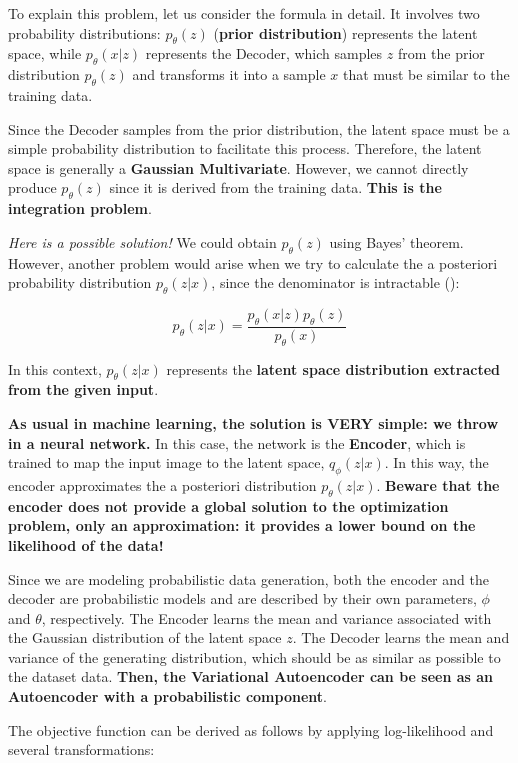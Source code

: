 To explain this problem, let us consider the formula in detail. It involves two probability distributions: $p_{\theta}(z)$ (\textbf{prior distribution}) represents the latent space, while $p_{\theta}(x|z)$ represents the Decoder, which samples $z$ from the prior distribution $p_{\theta}(z)$ and transforms it into a sample $x$ that must be similar to the training data.

Since the Decoder samples from the prior distribution, the latent space must be a simple probability distribution to facilitate this process. Therefore, the latent space is generally a \textbf{Gaussian Multivariate}. However, we cannot directly produce $p_{\theta}(z)$ since it is derived from the training data. \textbf{This is the integration problem}.

\textit{Here is a possible solution!} We could obtain $p_{\theta}(z)$ using Bayes' theorem. However, another problem would arise when we try to calculate the a posteriori probability distribution $p_{\theta}(z|x)$, since the denominator is intractable ():

$$p_{\theta}(z|x)= \frac{p_{\theta}(x|z)p_{\theta}(z)}{p_{\theta}(x)}$$

In this context, $p_{\theta}(z|x)$ represents the \textbf{latent space distribution extracted from the given input}.

\textbf{As usual in machine learning, the solution is VERY simple: we throw in a neural network.} In this case, the network is the \textbf{Encoder}, which is trained to map the input image to the latent space, $q_{\phi}(z|x)$. In this way, the encoder approximates the a posteriori distribution $p_{\theta}(z|x)$. \textbf{\textcolor{myred}{Beware that the encoder does not provide a global solution to the optimization problem, only an approximation: it provides a lower bound on the likelihood of the data!}}

Since we are modeling probabilistic data generation, both the encoder and the decoder are probabilistic models and are described by their own parameters, $\phi$ and $\theta$, respectively. The Encoder learns the mean and variance associated with the Gaussian distribution of the latent space $z$. The Decoder learns the mean and variance of the generating distribution, which should be as similar as possible to the dataset data.  \textbf{Then, the Variational Autoencoder can be seen as an Autoencoder with a probabilistic component}.

The objective function can be derived as follows by applying log-likelihood and several transformations:

